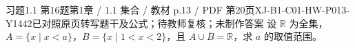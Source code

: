\par\noindent\begin{minipage}{\linewidth}
\begin{bankitem}{习题1.1 第16题}{第1章 / 1.1 集合 / 教材 p.13 / PDF 第20页}{XJ-B1-C01-HW-P013-Y1442}{已对照原页转写题干及公式；待教师复核；未制作答案}
设 $\mathbb R$ 为全集，$A=\{x\mid x<a\}$，$B=\{x\mid1<x<2\}$，且 $A\cup\overline B=\mathbb R$，求 $a$ 的取值范围。
\end{bankitem}
\end{minipage}\par\medskip
